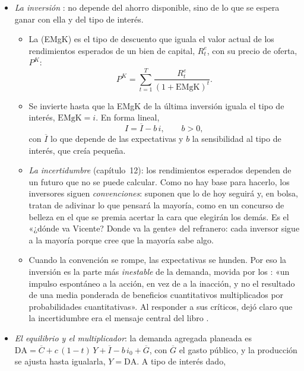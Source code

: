 \documentclass[11pt]{article}
\begin{document}
\begin{itemize}
\item \emph{La inversión} : no depende del ahorro disponible, sino de lo que se espera ganar con ella y del tipo de interés\nocite{Keynes1936}.
  \begin{itemize}
  \item La  (EMgK) es el tipo de descuento que iguala el valor actual de los rendimientos esperados de un bien de capital, $R^e_t$, con su precio de oferta, $P^K$:
    \begin{equation}
    P^K=\sum_{t=1}^{T}\frac{R^e_t}{(1+\mathrm{EMgK})^t}. \label{eq:emgk}
    \end{equation}
  \item Se invierte hasta que la EMgK de la última inversión iguala el tipo de interés, $\mathrm{EMgK}=i$. En forma lineal,
    \begin{equation}
    I=\overline{I}-b\,i,\qquad b>0, \label{eq:inversion}
    \end{equation}
    con $\overline{I}$ lo que depende de las expectativas y $b$ la sensibilidad al tipo de interés, que  creía pequeña.
  \item \emph{La incertidumbre} (capítulo~12): los rendimientos esperados dependen de un futuro que no se puede calcular. Como no hay base para hacerlo, los inversores siguen \emph{convenciones}: suponen que lo de hoy seguirá y, en bolsa, tratan de adivinar lo que pensará la mayoría, como en un concurso de belleza en el que se premia acertar la cara que elegirán los demás\nocite{Keynes1936}. Es el «¿dónde va Vicente? Donde va la gente» del refranero: cada inversor sigue a la mayoría porque cree que la mayoría sabe algo.
  \item Cuando la convención se rompe, las expectativas se hunden. Por eso la inversión es la parte más \emph{inestable} de la demanda, movida por los : «un impulso espontáneo a la acción, en vez de a la inacción, y no el resultado de una media ponderada de beneficios cuantitativos multiplicados por probabilidades cuantitativas»\nocite{Keynes1936}. Al responder a sus críticos, \textcite{Keynes1937General} dejó claro que la incertidumbre era el mensaje central del libro .
  \end{itemize}
\item \emph{El equilibrio y el multiplicador}: la demanda agregada planeada es $\mathrm{DA}=\overline{C}+c\,(1-t)\,Y+\overline{I}-b\,i_0+\overline{G}$, con $\overline{G}$ el gasto público, y la producción se ajusta hasta igualarla, $Y=\mathrm{DA}$. A tipo de interés dado,

\end{itemize}
\end{document}
